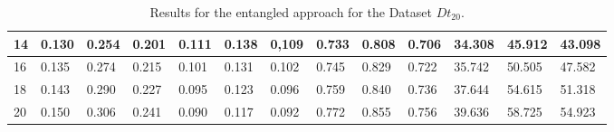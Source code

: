 \begin{table*}[]
\begin{tabular}{|l | lll| lll |lll |lll|}
		14 & 0.130   & 0.254   & 0.201  & 0.111    & 0.138    & 0,109   &  0.733     & 0.808    & 0.706    & 34.308     & 45.912     & 43.098     \\ \hline
		16 & 0.135   & 0.274   & 0.215  &  0.101    & 0.131    & 0.102   & 0.745    & 0.829    & 0.722    & 35.742     & 50.505     & 47.582     \\ \hline
		18 & 0.143   & 0.290   & 0.227  & 0.095   & 0.123    & 0.096   & 0.759     & 0.840    & 0.736    & 37.644     & 54.615     & 51.318     \\ \hline
		20 & 0.150   & 0.306   & 0.241  & 0.090    & 0.117    & 0.092   & 0.772     & 0.855    & 0.756    & 39.636    & 58.725     & 54.923    \\ \hline
	\end{tabular}
	\vspace{.2cm}
	\caption{Results for the entangled approach for the Dataset $Dt_{20}$.}
	\label{tab:combined_dt20}
\end{table*}